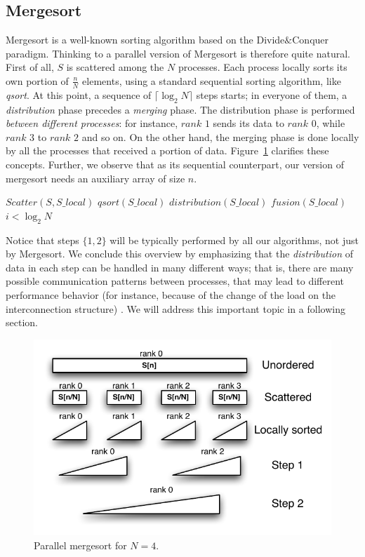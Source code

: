 \subsection{Mergesort}
Mergesort is a well-known sorting algorithm based on the Divide$\&$Conquer paradigm. Thinking to a parallel version of Mergesort is therefore quite natural. First of all, $S$ is scattered among the $N$ processes. Each process locally sorts its own portion of $\frac{n}{N}$ elements, using a standard sequential sorting algorithm, like \textit{qsort}. At this point, a sequence of $\lceil \log_{2}{N} \rceil$ steps starts; in everyone of them, a \textit{distribution} phase precedes a \textit{merging} phase. The distribution phase is performed \textit{between different processes}: for instance, $rank$ $1$ sends its data to $rank$ $0$, while $rank$ $3$ to $rank$ $2$ and so on. On the other hand, the merging phase is done locally by all the processes that received a portion of data. Figure~\ref{merge-dist} clarifies these concepts. Further, we observe that as its sequential counterpart, our version of mergesort needs an auxiliary array of size $n$. 
\begin{algorithmic}[1]  
	\medskip
	\STATE $Scatter( S, S\_local )$
	\STATE $qsort( S\_local )$
	\REPEAT 
		\STATE $distribution( S\_local )$
		\STATE $fusion ( S\_local )$
	\UNTIL $i < \log_{2}{N}$
	\medskip
\label{alg1}
\end{algorithmic}
Notice that steps $\lbrace 1, 2 \rbrace$ will be typically performed by all our algorithms, not just by Mergesort. We conclude this overview by emphasizing that the \textit{distribution} of data in each step can be handled in many different ways; that is, there are many possible communication patterns between processes, that may lead to different performance behavior (for instance, because of the change of the load on the interconnection structure) . We will address this important topic in a following section.

\begin{figure}[h]
        \centerline{
               \mbox{\includegraphics[scale=0.70]{mergesort-pict1}}
        }
        \caption{Parallel mergesort for $N = 4$.}
        \label{merge-dist}
\end{figure}

